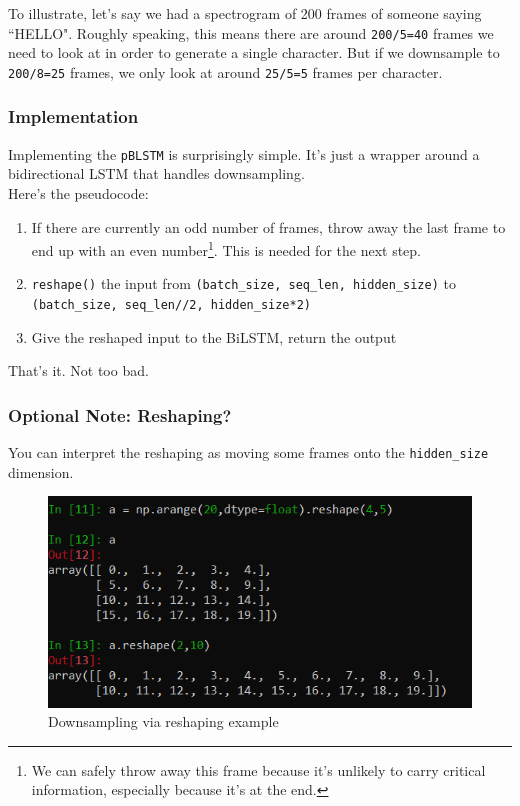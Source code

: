 \documentclass{article}
\newcommand{\ttt}[1]{\texttt{#1}}
\begin{document}
To illustrate, let's say we had a spectrogram of 200 frames of someone saying ``HELLO". Roughly speaking, this means there are around \ttt{200/5=40} frames we need to look at in order to generate a single character. But if we downsample to \ttt{200/8=25} frames, we only look at around \ttt{25/5=5} frames per character.

\subsubsection{Implementation}

Implementing the \ttt{pBLSTM} is surprisingly simple. It's just a wrapper around a bidirectional LSTM that handles downsampling.  \\

Here's the pseudocode:

\begin{enumerate}
    \item If there are currently an odd number of frames, throw away the last frame to end up with an even number\footnote{We can safely throw away this frame because it's unlikely to carry critical information, especially because it's at the end.}. This is needed for the next step.
    \item \ttt{reshape()} the input from \ttt{(batch\_size, seq\_len, hidden\_size)} to \\ \ttt{(batch\_size, seq\_len//2, hidden\_size*2)}
    \item Give the reshaped input to the BiLSTM, return the output
\end{enumerate}

That's it. Not too bad. \\


\newpage

\subsubsection{Optional Note: Reshaping?}

You can interpret the reshaping as moving some frames onto the \ttt{hidden\_size} dimension. 

\begin{figure}[h]
\centering
\includegraphics[scale=0.9]{images/reshaping.png}
\caption{Downsampling via reshaping example}
\end{figure}
\end{document}
